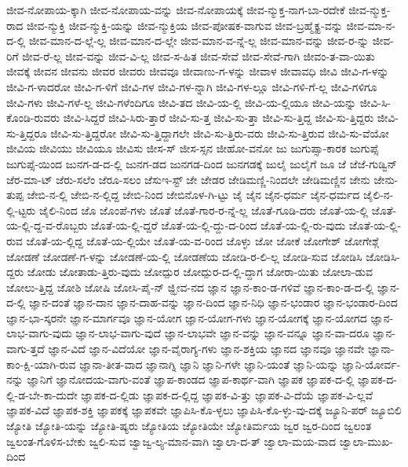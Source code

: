 {ಜೀವ-ನೋಪಾಯ-ಕ್ಕಾಗಿ
ಜೀವ-ನೋಪಾಯ-ವನ್ನು
ಜೀವ-ನೋಪಾಯಕ್ಕೆ
ಜೀವ-ನ್ಮುಕ್ತ-ನಾಗ-ಬಾ-ರದೇಕೆ
ಜೀವ-ನ್ಮುಕ್ತ-ರಾದ
ಜೀವ-ನ್ಮುಕ್ತಿ
ಜೀವ-ನ್ಮುಕ್ತಿ-ಯನ್ನು
ಜೀವ-ನ್ಮುಕ್ತಿಯ
ಜೀವ-ಪೋಷಕ-ವಾಗುವ
ಜೀವ-ಬ್ರಹ್ಮೈಕ್ಯ-ವನ್ನು
ಜೀವ-ಮಾ-ನ-ದ-ಲ್ಲಿ
ಜೀವ-ಮಾನ-ದ-ಲ್ಲೆ-ಲ್ಲ
ಜೀವ-ಮಾನ-ದ-ಲ್ಲೇ
ಜೀವ-ಮಾನ-ವ-ನ್ನೆ-ಲ್ಲ
ಜೀವ-ಮಾನ-ವನ್ನು
ಜೀವ-ರ-ನ್ನು
ಜೀವ-ರಿಗೆ
ಜೀವ-ರೆ-ಲ್ಲ
ಜೀವ-ವನ್ನು
ಜೀವ-ವಿ-ಲ್ಲ
ಜೀವ-ಸ-ಹಿತ
ಜೀವ-ಸೇವೆ
ಜೀವ-ಸೇವೆ-ಗಾಗಿ
ಜೀವಂ-ತ-ವಾ-ಯಿತು
ಜೀವಕ್ಕೆ
ಜೀವನ
ಜೀವನು
ಜೀವರ
ಜೀವರು
ಜೀವವೂ
ಜೀವಾಣು-ಗ-ಳನ್ನು
ಜೀವಾಳ
ಜೀವಾವಧಿ
ಜೀವಿ
ಜೀವಿ-ಗ-ಳನ್ನು
ಜೀವಿ-ಗ-ಳಾದರೋ
ಜೀವಿ-ಗ-ಳಿಗೆ
ಜೀವಿ-ಗಳ
ಜೀವಿ-ಗಳ-ನ್ನಾಗಿ
ಜೀವಿ-ಗಳ-ಲ್ಲೂ
ಜೀವಿ-ಗಳಿ-ಗೆ-ಲ್ಲ
ಜೀವಿ-ಗಳಿಗೂ
ಜೀವಿ-ಗಳು
ಜೀವಿ-ಗಳೆ-ಲ್ಲ
ಜೀವಿ-ಗಳೆಂದಿಗೂ
ಜೀವಿ-ತದ
ಜೀವಿ-ಯ-ಲ್ಲಿ
ಜೀವಿ-ಯ-ಲ್ಲಿಯೂ
ಜೀವಿ-ಯನ್ನು
ಜೀವಿ-ಸಿ-ಕೊಂಡಿ-ರುವರು
ಜೀವಿ-ಸಿದ್ದರೆ
ಜೀವಿ-ಸಿರು-ತ್ತಾರೆ
ಜೀವಿ-ಸು-ತ್ತ
ಜೀವಿ-ಸು-ತ್ತಾ
ಜೀವಿ-ಸು-ತ್ತಿದ್ದ
ಜೀವಿ-ಸು-ತ್ತಿದ್ದರು
ಜೀವಿ-ಸು-ತ್ತಿದ್ದರೂ
ಜೀವಿ-ಸು-ತ್ತಿದ್ದರೋ
ಜೀವಿ-ಸು-ತ್ತಿದ್ದಾಗಲೇ
ಜೀವಿ-ಸು-ತ್ತಿರು-ವರು
ಜೀವಿ-ಸು-ತ್ತಿರುವ
ಜೀವಿ-ಸು-ವೆಯೋ
ಜೀವಿಯ
ಜೀವಿಯು
ಜೀವಿಯೂ
ಜೀವಿಸು
ಜೀಸ-ಸ್
ಜೀಸ-ಸ್ಸನ
ಜೀಹೋ-ವನೋ
ಜು
ಜುಗುಪ್ಸಾ-ಕಾರಕ
ಜುಗುಪ್ಸೆ
ಜುಗುಪ್ಸೆ-ಯಿಂದ
ಜುನಗ-ಡ-ದ-ಲ್ಲಿ
ಜುನಗ-ಡದ
ಜುನಗಡ-ದಿಂದ
ಜುನಗಡಕ್ಕೆ
ಜುಲೈ
ಜುಲೈಗೆ
ಜೂ
ಜೆ
ಜೆಜೆ-ಗುಡ್ವಿನ್
ಜೆರ-ಮಾ-ಟ್
ಜೆರು-ಸಲೆಂ
ಜೆರೂ-ಸಲಂ
ಜೆಸುಇ-ಸ್ಟ್
ಜೇ
ಜೇಡರ
ಜೇಡಿಮಣ್ಣಿ-ನಿಂದಲೇ
ಜೇಡಿಮಣ್ಣಿನ
ಜೇನು
ಜೇನು-ತುಪ್ಪ
ಜೇಬಿ-ನ-ಲ್ಲಿ
ಜೇಬಿ-ನ-ಲ್ಲಿದ್ದ
ಜೇಬಿ-ನಿಂದ
ಜೇಬಿನೊಳ-ಗಿ-ಟ್ಟು
ಜೈ
ಜೈನ
ಜೈನ-ಧರ್ಮ
ಜೈನ-ಧರ್ಮದ
ಜೈಲಿ-ನ-ಲ್ಲಿ-ಟ್ಟರು
ಜೈಲಿ-ನಿಂದ
ಜೊ
ಜೊಂಪೆ-ಗಳು
ಜೊತೆ
ಜೊತೆ-ಗಾರ-ರ-ನ್ನೆ-ಲ್ಲ
ಜೊತೆ-ಗೂಡಿ-ದರು
ಜೊತೆ-ಯ-ಲ್ಲಿ
ಜೊತೆ-ಯ-ಲ್ಲಿ-ದ್ದ-ವ-ರೊಬ್ಬರು
ಜೊತೆ-ಯ-ಲ್ಲಿ-ದ್ದರೆ
ಜೊತೆ-ಯ-ಲ್ಲಿ-ದ್ದು-ದ-ರಿಂದ
ಜೊತೆ-ಯ-ಲ್ಲಿ-ರು-ವುದು
ಜೊತೆ-ಯ-ಲ್ಲಿ-ರುವ
ಜೊತೆ-ಯ-ಲ್ಲಿದ್ದ
ಜೊತೆ-ಯ-ಲ್ಲಿಯೇ
ಜೊತೆ-ಯ-ವ-ರಿಂದ
ಜೊಳ್ಳು
ಜೋ
ಜೋಕೆ
ಜೋಗೇಶ್
ಜೋಗೇಶ್ಗೆ
ಜೋಡಣೆ
ಜೋಡಣೆ-ಗ-ಳನ್ನು
ಜೋಡಣೆ-ಯ-ಲ್ಲಿ
ಜೋಡಣೆಯ
ಜೋಡಿ-ರ-ಲಿ-ಲ್ಲ
ಜೋಡಿ-ಸುವ
ಜೋಡಿಸಿ
ಜೋಡಿಸಿ-ದ್ದರು
ಜೋಡು
ಜೋತಾಡು-ತ್ತಿರು-ವುದು
ಜೋದ್ಪುರ
ಜೋದ್ಪುರ-ದ-ಲ್ಲಿ-ದ್ದಾಗ
ಜೋರಾ-ಯಿತು
ಜೋಲಾ-ಡುವ
ಜೋಲು-ತ್ತಿದ್ದ
ಜೋಶಿ
ಜೋಷಿ
ಜೋಸಿ-ಪೈ-ನ್
ಜ್ಝೀವ-ನದ
ಜ್ಞಾನ
ಜ್ಞಾನ-ಕಾಂ-ಡ-ಗಳಿವೆ
ಜ್ಞಾನ-ಕಾಂ-ಡ-ದ-ಲ್ಲಿ
ಜ್ಞಾನ-ದ-ಲ್ಲಿ
ಜ್ಞಾನ-ದಂತೆ
ಜ್ಞಾನ-ದಾನ
ಜ್ಞಾನ-ದಾಹ-ವನ್ನು
ಜ್ಞಾನ-ದಿಂದ
ಜ್ಞಾನ-ನಿಧಿ
ಜ್ಞಾನ-ಭಂಡಾರ
ಜ್ಞಾನ-ಭಂಡಾರ-ದಿಂದ
ಜ್ಞಾನ-ಭಾ-ಸ್ಕರನೇ
ಜ್ಞಾನ-ಮಾರ್ಗವೂ
ಜ್ಞಾನ-ಯೋಗ
ಜ್ಞಾನ-ಯೋಗ-ಗಳು
ಜ್ಞಾನ-ಯೋಗಕ್ಕೆ
ಜ್ಞಾನ-ಯೋಗದ
ಜ್ಞಾನ-ಲಾಭ-ವಾಗು-ವುದು
ಜ್ಞಾನ-ಲಾಭ-ವಾಗು-ವುದೆ
ಜ್ಞಾನ-ಲಾಭವೇ
ಜ್ಞಾನ-ವನ್ನು
ಜ್ಞಾನ-ವನ್ನೂ
ಜ್ಞಾನ-ವಾ-ದರೂ
ಜ್ಞಾನ-ವಾಗು-ತ್ತದೆ
ಜ್ಞಾನ-ವಿದೆ
ಜ್ಞಾನ-ವಿದೆಯೋ
ಜ್ಞಾನ-ವೈರಾಗ್ಯ-ಗಳು
ಜ್ಞಾನ-ಶಕ್ತಿಯ
ಜ್ಞಾನದ
ಜ್ಞಾನವೂ
ಜ್ಞಾನವೇ
ಜ್ಞಾನಾ-ಕಾಂ-ಕ್ಷಿ-ಯಾಗಿ-ರುವ
ಜ್ಞಾನಾ-ತೀತ-ವಾದ
ಜ್ಞಾನಾಗ್ನಿ
ಜ್ಞಾನಿ
ಜ್ಞಾನಿ-ಗಳೇ
ಜ್ಞಾನಿ-ಯಂತೆ
ಜ್ಞಾನಿ-ಯನ್ನು
ಜ್ಞಾನಿ-ಯೋರ್ವ-ನನ್ನು
ಜ್ಞಾನಿಗೆ
ಜ್ಞಾನೋದಯ-ವಾಗು-ವಂತೆ
ಜ್ಞಾಪ-ಕಾಂಡದ
ಜ್ಞಾಪ-ಕಾರ್ಥ-ವಾಗಿ
ಜ್ಞಾಪಕ
ಜ್ಞಾಪಕ-ದ-ಲ್ಲಿ
ಜ್ಞಾಪಕ-ದ-ಲ್ಲಿ-ಡ-ಬೇ-ಕಾ-ದುದೇ
ಜ್ಞಾಪಕ-ದ-ಲ್ಲಿಡು
ಜ್ಞಾಪಕ-ದ-ಲ್ಲಿದ್ದ
ಜ್ಞಾಪಕ-ವಿ-ತ್ತು
ಜ್ಞಾಪಕ-ವಿ-ದೆಯೆ
ಜ್ಞಾಪಕ-ವಿ-ಲ್ಲವೆ
ಜ್ಞಾಪಕ-ವಿದೆ
ಜ್ಞಾಪಕ-ಶಕ್ತಿ
ಜ್ಞಾಪಕಕ್ಕೆ
ಜ್ಞಾಪಕವೇ
ಜ್ಞಾಪಿಸಿ-ಕೊ-ಳ್ಳಲು
ಜ್ಞಾಪಿಸಿ-ಕೊ-ಳ್ಳು-ವು-ದಕ್ಕೆ
ಜ್ಯೂನಿ-ಪರ್
ಜ್ಯೂಬಿಲಿ
ಜ್ಯೋತಿ
ಜ್ಯೋತಿ-ಯನ್ನು
ಜ್ಯೋತಿ-ಷ್ಯರು
ಜ್ಯೋತಿಯ
ಜ್ಯೋತಿಯೇ
ಜ್ಯೋತಿರ್ಮಯ
ಜ್ವರ
ಜ್ವರ-ದಿಂದ
ಜ್ವಲಂತ
ಜ್ವಲಂತ-ಗೊಳಿಸ-ಬೇಕು
ಜ್ವಲಿ-ಸುವ
ಜ್ವಾಜ್ವ-ಲ್ಯ-ಮಾನ-ವಾಗಿ
ಜ್ವಾಲಾ-ದ-ತ್
ಜ್ವಾಲಾ-ಮಯ-ವಾದ
ಜ್ವಾಲಾ-ಮುಖ-ದಿಂದ
}
